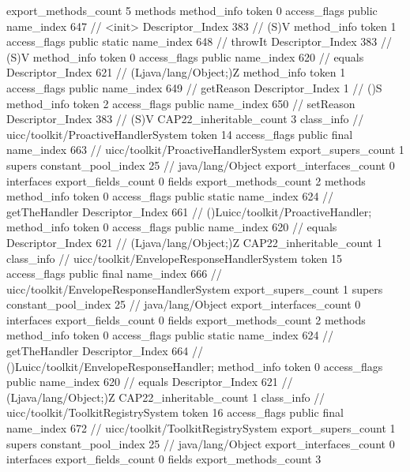 {{{{{{{				}
				}
			}
			}
			export_methods_count	5
			methods {
				method_info {
					token	0
					access_flags	public
					name_index	647		// <init>
					Descriptor_Index	383		// (S)V
				}
				method_info {
					token	1
					access_flags	public static
					name_index	648		// throwIt
					Descriptor_Index	383		// (S)V
				}
				method_info {
					token	0
					access_flags	public
					name_index	620		// equals
					Descriptor_Index	621		// (Ljava/lang/Object;)Z
				}
				method_info {
					token	1
					access_flags	public
					name_index	649		// getReason
					Descriptor_Index	1		// ()S
				}
				method_info {
					token	2
					access_flags	public
					name_index	650		// setReason
					Descriptor_Index	383		// (S)V
				}
			}
			CAP22_inheritable_count	3
		}
		class_info {		// uicc/toolkit/ProactiveHandlerSystem
			token	14
			access_flags	public final
			name_index	663		// uicc/toolkit/ProactiveHandlerSystem
			export_supers_count	1
			supers {
				constant_pool_index	25		// java/lang/Object
			}
			export_interfaces_count	0
			interfaces {
			}
			export_fields_count	0
			fields {
			}
			export_methods_count	2
			methods {
				method_info {
					token	0
					access_flags	public static
					name_index	624		// getTheHandler
					Descriptor_Index	661		// ()Luicc/toolkit/ProactiveHandler;
				}
				method_info {
					token	0
					access_flags	public
					name_index	620		// equals
					Descriptor_Index	621		// (Ljava/lang/Object;)Z
				}
			}
			CAP22_inheritable_count	1
		}
		class_info {		// uicc/toolkit/EnvelopeResponseHandlerSystem
			token	15
			access_flags	public final
			name_index	666		// uicc/toolkit/EnvelopeResponseHandlerSystem
			export_supers_count	1
			supers {
				constant_pool_index	25		// java/lang/Object
			}
			export_interfaces_count	0
			interfaces {
			}
			export_fields_count	0
			fields {
			}
			export_methods_count	2
			methods {
				method_info {
					token	0
					access_flags	public static
					name_index	624		// getTheHandler
					Descriptor_Index	664		// ()Luicc/toolkit/EnvelopeResponseHandler;
				}
				method_info {
					token	0
					access_flags	public
					name_index	620		// equals
					Descriptor_Index	621		// (Ljava/lang/Object;)Z
				}
			}
			CAP22_inheritable_count	1
		}
		class_info {		// uicc/toolkit/ToolkitRegistrySystem
			token	16
			access_flags	public final
			name_index	672		// uicc/toolkit/ToolkitRegistrySystem
			export_supers_count	1
			supers {
				constant_pool_index	25		// java/lang/Object
			}
			export_interfaces_count	0
			interfaces {
			}
			export_fields_count	0
			fields {
			}
			export_methods_count	3
}}}
